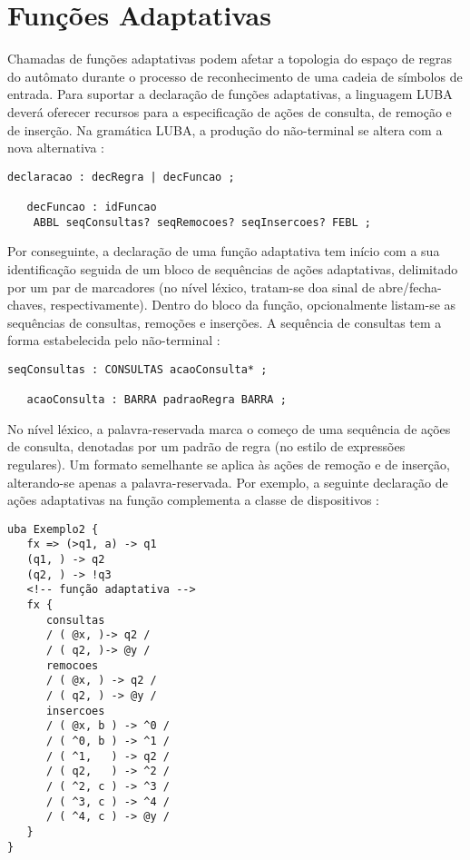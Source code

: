 \section{Funções Adaptativas}
\label{sec:isv:chamada-funcao-adaptativa}

Chamadas de funções adaptativas podem afetar a topologia do espaço de regras do autômato durante o processo de reconhecimento de uma cadeia de símbolos de entrada. Para suportar a declaração de funções adaptativas, a linguagem LUBA deverá oferecer recursos para a especificação de ações de consulta, de remoção e de inserção. Na gramática LUBA, a produção do não-terminal  se altera com a nova alternativa :

\begin{lstlisting}[style=antlr]
declaracao : decRegra | decFuncao ;

   decFuncao : idFuncao
   	ABBL seqConsultas? seqRemocoes? seqInsercoes? FEBL ;
\end{lstlisting}

\noindent
Por conseguinte, a declaração de uma função adaptativa tem início com a sua identificação seguida de um bloco de sequências de ações adaptativas, delimitado por um par de marcadores (no nível léxico, tratam-se doa sinal de abre/fecha-chaves, respectivamente). Dentro do bloco da função, opcionalmente listam-se as sequências de consultas, remoções e inserções. A sequência de consultas tem a forma estabelecida pelo não-terminal :

\begin{lstlisting}[style=antlr]
seqConsultas : CONSULTAS acaoConsulta* ;

   acaoConsulta : BARRA padraoRegra BARRA ;
\end{lstlisting}

No nível léxico, a palavra-reservada  marca o começo de uma sequência de ações de consulta, denotadas por um padrão de regra (no estilo de expressões regulares). Um formato semelhante se aplica às ações de remoção e de inserção, alterando-se apenas a palavra-reservada. Por exemplo, a seguinte declaração de ações adaptativas na função  complementa a classe de dispositivos :

\begin{lstlisting}
uba Exemplo2 {
   fx => (>q1, a) -> q1
   (q1, ) -> q2
   (q2, ) -> !q3
   <!-- função adaptativa -->
   fx {
      consultas
      / ( @x, )-> q2 /
      / ( q2, )-> @y /
      remocoes
      / ( @x, ) -> q2 /
      / ( q2, ) -> @y /
      insercoes
      / ( @x, b ) -> ^0 /
      / ( ^0, b ) -> ^1 /
      / ( ^1,   ) -> q2 /
      / ( q2,   ) -> ^2 /
      / ( ^2, c ) -> ^3 /
      / ( ^3, c ) -> ^4 /
      / ( ^4, c ) -> @y /
   }
}
\end{lstlisting}

